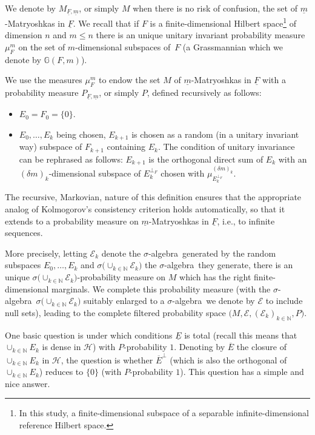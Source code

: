 \documentclass[10pt,a4paper]{article}
\newcommand{\hilH}{\mathcal H}
\newcommand{\kN}{k\in \mathbb{N}}
\newcommand{\perpF}{{\perp _F}}
\newcommand{\algE}{{\mathcal E}}
\newcommand{\salg}{$\sigma$-algebra}
\begin{document}
We denote by $M_{\underline{F},\underline{m}}$, or simply $M$ when there is no risk of confusion, the set of $\underline{m}$-Matryoshkas in $\underline{F}$.
We recall that if $F$ is a finite-dimensional Hilbert space\footnote{In this study, a finite-dimensional subspace of a separable infinite-dimensional reference Hilbert space.} of dimension $n$ and $m\leq n$ there is an unique unitary invariant probability measure $\mu_F^m$ on the set of $m$-dimensional subspaces of~$F$ (a Grassmannian which we denote by $\mathbb{G}(F,m)$).


We use the measures $\mu_F^m$ to endow the set $M$ of $\underline{m}$-Matryoshkas in $\underline{F}$ with a probability measure $P_{\underline{F},\underline{m}}$, or simply $P$, defined recursively as follows:
\begin{itemize}\itemsep=0pt
\item $E_0=F_0=\{0\}$.
\item $E_0,\dots,E_k$ being chosen, $E_{k+1}$ is chosen as a random (in a unitary invariant way) subspace of $F_{k+1}$ containing $E_k$. The condition of unitary invariance can be rephrased as follows: $E_{k+1}$ is the orthogonal direct sum of $E_k$ with an $(\delta m)_k$-dimensional subspace of $E_k^\perpF$ chosen with $\mu_{E_k^\perpF}^{(\delta m)_k}$.
\end{itemize}

The recursive, Markovian, nature of this definition ensures that the appropriate analog of Kolmogorov's consistency criterion holds automatically, so that it extends to a probability measure on $\underline{m}$-Matryoshkas in $\underline{F}$, i.e., to infinite sequences.

More precisely, letting $\algE_k$ denote the \salg\ generated by the random subspaces $E_0,\dots,E_k$ and $\sigma \big(\cup_{\kN} \algE_k\big)$ the \salg\ they generate, there is an unique $\sigma \big(\cup_{\kN} \algE_k\big)$-probability measure on $M$ which has the right finite-dimensional marginals. We complete this probability measure \big(with the \salg\ $\sigma \big(\cup_{\kN} \algE_k\big)$ suitably enlarged to a \salg\ we denote by $\algE$ to include null sets\big), leading to the complete filtered probability space $\big(M,\algE, (\algE_k)_{\kN},P\big)$.

One basic question is under which conditions $\underline{E}$ is total \big(recall this means that $\cup_{\kN}E_k$ is dense in $\hilH$\big) with $P$-probability $1$. Denoting by $\overline{E}$ the closure of $\cup_{\kN}E_k$ in $\hilH$, the question is whether $\overline{E}^\perp$ \big(which is also the orthogonal of $\cup_{\kN}E_k$\big) reduces to $\{0\}$ (with $P$-probability $1$). This question has a simple and nice answer.
\end{document}
